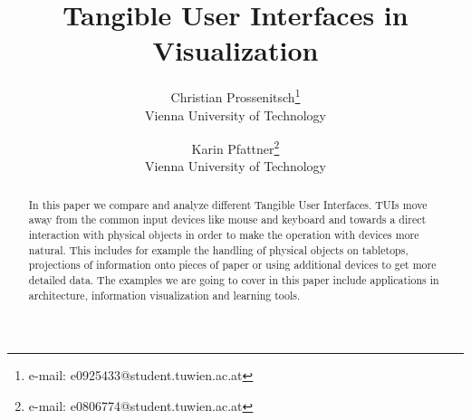 \documentclass[preprint]{acmsiggraph}    %
\title{Tangible User Interfaces in Visualization}
\author{Christian Prossenitsch\thanks{e-mail: e0925433@student.tuwien.ac.at}\\ Vienna University of Technology %
\and Karin Pfattner\thanks{e-mail: e0806774@student.tuwien.ac.at}\\ Vienna University of Technology}%
\begin{document}

\maketitle


\begin{abstract}


In this paper we compare and analyze different Tangible User Interfaces. TUIs move away from the common input devices like mouse and keyboard and towards a direct interaction with physical objects in order to make the operation with devices more natural. This includes for example the handling of physical objects on tabletops, projections of information onto pieces of paper or using additional devices to get more detailed data. The examples we are going to cover in this paper include applications in architecture, information visualization and learning tools. 



\end{abstract}



\keywordlist









\nocite{*}

\end{document}
